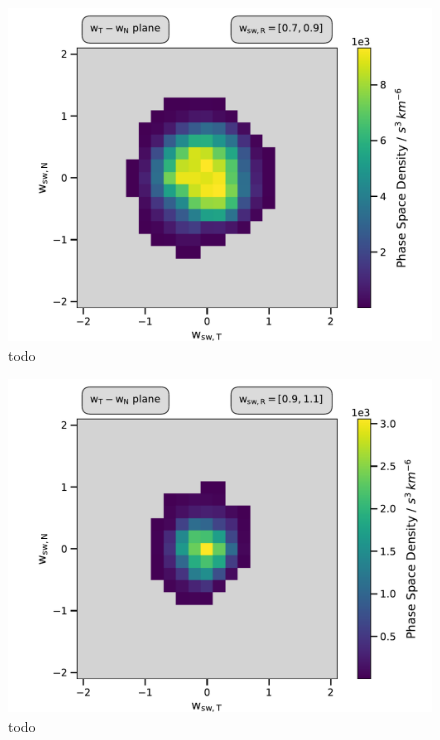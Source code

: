 \begin{figure}[h]
	\includegraphics[width=1.\textwidth]{Figures/slices_50_7.pdf}
	\centering
	\caption{todo}
	\label{fig:todo}
\end{figure}

\begin{figure}[h]
	\includegraphics[width=1.\textwidth]{Figures/slices_50_9.pdf}
	\centering
	\caption{todo}
	\label{fig:todo}
\end{figure}


